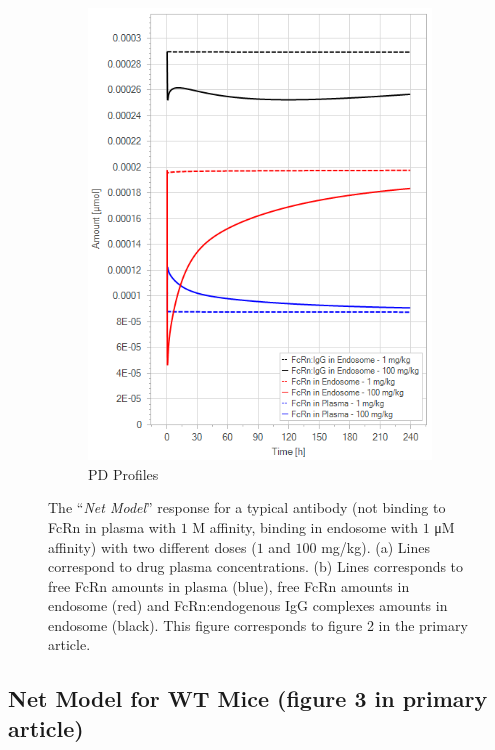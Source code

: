 \documentclass[fleqn,10pt]{physiome}
\begin{document}
\begin{figure}[htb]
\begin{subfigure}{0.49\textwidth}
        \includegraphics[width=\textwidth]{pl2.png}
        \caption{PD Profiles}
        \label{fig:1b}
    \end{subfigure}
    \caption{The ``\textit{Net Model}'' response for a typical antibody (not binding to FcRn in plasma with $1$ \si{M} affinity, binding in endosome with $1$ \si{\micro M} affinity) with two different doses ($1$ and $100$ mg/kg). (a) Lines correspond to drug plasma concentrations. (b) Lines corresponds to free FcRn amounts in plasma (blue), free FcRn amounts in endosome (red) and FcRn:endogenous IgG complexes amounts in endosome (black). This figure corresponds to figure 2 in the primary article.}
    \label{fig:1}
\end{figure}



\subsection{Net Model for WT Mice (figure 3 in primary article)}\label{Figure3}
\end{document}

